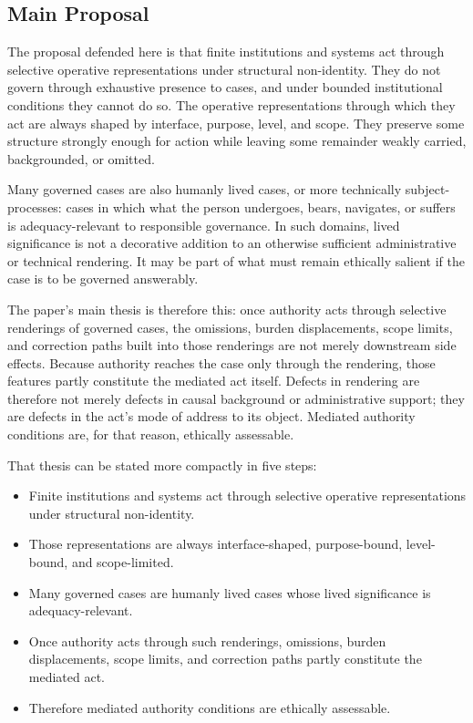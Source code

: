 \documentclass[11pt]{article}
\begin{document}
\subsection{Main Proposal}

The proposal defended here is that finite institutions and systems act through selective operative representations under structural non-identity. They do not govern through exhaustive presence to cases, and under bounded institutional conditions they cannot do so. The operative representations through which they act are always shaped by interface, purpose, level, and scope. They preserve some structure strongly enough for action while leaving some remainder weakly carried, backgrounded, or omitted. \cite{Swanson2026MediatedJudgmentConstraint,Swanson2026ConstraintConditionDisclosure,Swanson2026EmbeddedProcess,Swanson2026SharedRealityConditionDisclosure}

Many governed cases are also humanly lived cases, or more technically subject-processes: cases in which what the person undergoes, bears, navigates, or suffers is adequacy-relevant to responsible governance. In such domains, lived significance is not a decorative addition to an otherwise sufficient administrative or technical rendering. It may be part of what must remain ethically salient if the case is to be governed answerably.

The paper's main thesis is therefore this: once authority acts through selective renderings of governed cases, the omissions, burden displacements, scope limits, and correction paths built into those renderings are not merely downstream side effects. Because authority reaches the case only through the rendering, those features partly constitute the mediated act itself. Defects in rendering are therefore not merely defects in causal background or administrative support; they are defects in the act's mode of address to its object. Mediated authority conditions are, for that reason, ethically assessable.

That thesis can be stated more compactly in five steps:
\begin{itemize}
    \item Finite institutions and systems act through selective operative representations under structural non-identity.
    \item Those representations are always interface-shaped, purpose-bound, level-bound, and scope-limited.
    \item Many governed cases are humanly lived cases whose lived significance is adequacy-relevant.
    \item Once authority acts through such renderings, omissions, burden displacements, scope limits, and correction paths partly constitute the mediated act.
    \item Therefore mediated authority conditions are ethically assessable.
\end{itemize}
\end{document}
